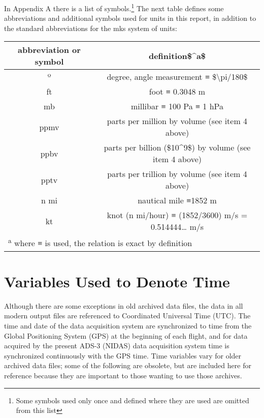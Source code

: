 \documentclass[
]{book}
\begin{document}
In Appendix A there is a list of symbols.\footnote{Some symbols used only once and defined where they are used are omitted from this list} The next table defines some abbreviations and additional symbols used for units in this report, in addition to the standard abbreviations for the mks system of units:

\begin{table}
\centering
\begin{tabular}{c|c}
\hline
abbreviation or symbol & definition\$\textasciicircum{}a\$\\
\hline
º & degree, angle measurement ≡ \$\textbackslash{}pi/180\$\\
\hline
ft & foot ≡ 0.3048 m\\
\hline
mb & millibar ≡ 100 Pa ≡ 1 hPa\\
\hline
ppmv & parts per million by volume (see item 4 above)\\
\hline
ppbv & parts per billion (\$10\textasciicircum{}9\$) by volume (see item 4 above)\\
\hline
pptv & parts per trillion by volume (see item 4 above)\\
\hline
n mi & nautical mile ≡1852 m\\
\hline
kt & knot (n mi/hour) ≡ (1852/3600) m/s = 0.514444… m/s\\
\hline
\multicolumn{2}{l}{\textsuperscript{a} where ≡ is used, the relation is exact by definition}\\
\end{tabular}
\end{table}

\hypertarget{variables-used-to-denote-time}{%
\section{Variables Used to Denote Time}\label{variables-used-to-denote-time}}

Although there are some exceptions in old archived data files, the data in all modern output files are referenced to Coordinated Universal Time (UTC). The time and date of the data acquisition system are synchronized to time from the Global Positioning System (GPS) at the beginning of each flight, and for data acquired by the present ADS-3 (NIDAS) data acquisition system time is synchronized continuously with the GPS time. Time variables vary for older archived data files; some of the following are obsolete, but are included here for reference because they are important to those wanting to use those archives.
\end{document}

